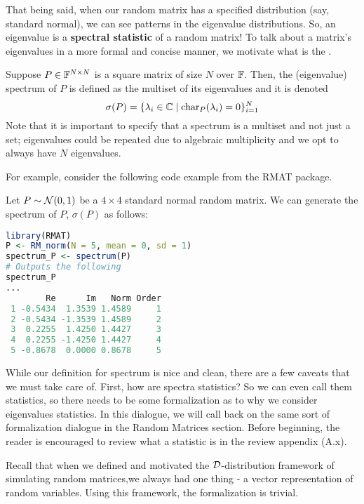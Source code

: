 That being said, when our random matrix has a specified distribution (say, standard normal), we can see patterns in the eigenvalue distributions. So, an eigenvalue is a \textbf{spectral statistic} of a random matrix! To talk about a matrix's eigenvalues in a more formal and concise manner, we motivate what is the .

\newpage

\begin{definition}[Spectrum]
Suppose $P \in \mathbb{F}^{N \times N}$ is a square matrix of size $N$ over $\mathbb{F}$. Then, the (eigenvalue) spectrum of $P$ is defined as the multiset of its eigenvalues and it is denoted
$$\sigma(P) = \{\lambda_i \in \mathbb{C} \mid \text{char}_P(\lambda_i) = 0 \}_{i=1}^N$$
Note that it is important to specify that a spectrum is a multiset and not just a set; eigenvalues could be repeated due to algebraic multiplicity and we opt to always have $N$ eigenvalues.
\end{definition}

\medskip
\noindent For example, consider the following code example from the RMAT package.
\begin{code}
Let $P \sim \mathcal{N}(0,1)$ be a $4 \times 4$ standard normal random matrix. We can generate the spectrum of $P$, $\sigma(P)$ as follows:
\end{code}

\begin{lstlisting}[language=R]
library(RMAT)
P <- RM_norm(N = 5, mean = 0, sd = 1)
spectrum_P <- spectrum(P)
# Outputs the following
spectrum_P
...
        Re      Im   Norm Order
 1 -0.5434  1.3539 1.4589     1
 2 -0.5434 -1.3539 1.4589     2
 3  0.2255  1.4250 1.4427     3
 4  0.2255 -1.4250 1.4427     4
 5 -0.8678  0.0000 0.8678     5
\end{lstlisting}

While our definition for spectrum is nice and clean, there are a few caveats that we must take care of. First, how are spectra statistics? So we can even call them statistics, so there needs to be some formalization as to why we consider eigenvalues statistics. In this dialogue, we will call back on the same sort of formalization dialogue in the Random Matrices section. Before beginning, the reader is encouraged to review what a statistic is in the review appendix (A.x).

Recall that when we defined and motivated the $\mathcal{D}$-distribution framework of simulating random matrices,we always had one thing - a vector representation of random variables. Using this framework, the formalization is trivial.

